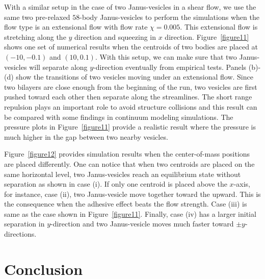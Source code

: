 \documentclass[lineno]{jfm}
\begin{document}
With a similar setup in the case of two Janus-vesicles in a shear flow, we use the same two pre-relaxed $58$-body Janus-vesicles to perform the simulations when the flow type is an extensional flow with flow rate $\chi=0.005$. This extensional flow is stretching along the $y$ direction and squeezing in $x$ direction.
Figure~\ref{figure11} shows one set of numerical results when the centroids of two bodies are placed at
$(-10,-0.1)$ and $(10,0.1)$. With this setup, we can make sure that two Janus-vesicles will separate along 
$y$-direction eventually from empirical tests. Panels (b)-(d) show the transitions of two vesicles moving under an extensional flow.  Since two bilayers are close enough from the beginning of the run, two vesicles are first pushed toward each other then separate along the streamlines. The short range repulsion plays an important role to avoid structure collisions and this result can be compared with some findings in continuum modeling simulations. The pressure plots in Figure~\ref{figure11} provide a realistic result where the pressure is much higher in the gap between two nearby vesicles. 

Figure~\ref{figure12} provides simulation results when the center-of-mass positions are placed differently.
One can notice that when two centroids are placed on the same horizontal level, two Janus-vesicles reach
an equilibrium state without separation as shown in case (i). If only one centroid is placed above the $x$-axis, for instance, case (ii), two Janus-vesicle move together toward the upward. This is the consequence when the adhesive effect beats the flow strength. Case (iii) is same as the case shown in Figure~\ref{figure11}. Finally, case (iv) has a larger initial separation in $y$-direction and two Janus-vesicle moves much faster toward 
$\pm y$-directions.






\section{\label{conclusion}Conclusion}


\begin{acknowledgments}
\end{acknowledgments}
\end{document}

